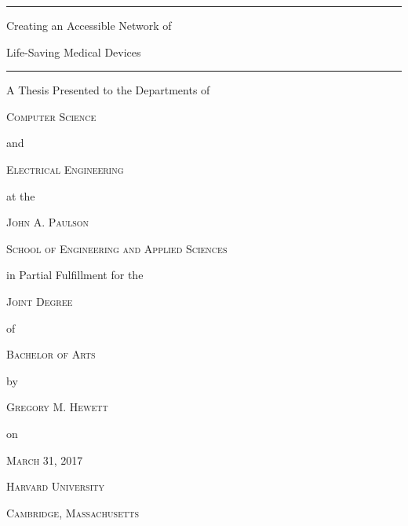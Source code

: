 \newcommand{\horrule}[1]{\rule{\linewidth}{#1}}

\begin{titlepage}
	\centering
	
	\horrule{0.7pt} \par
    {\huge Creating an Accessible Network of \par}
    {\huge Life-Saving Medical Devices \par}
    \horrule{0.7pt} \par
    \vspace{1cm}
    
    {\large A Thesis Presented to the Departments of \par}
    \vspace{0.25cm}
    {\scshape \large Computer Science \par}
    and \par
    {\scshape \large Electrical Engineering \par}
    \vspace{0.5cm}
    
    at the \par
    \vspace{0.05cm}
    {\scshape \large John A. Paulson \par}
    {\scshape \large School of Engineering and Applied Sciences \par}
    \vspace{0.75cm}
    
    in Partial Fulfillment for the \par
    \vspace{0.15cm}
    {\scshape \large Joint Degree \par}
    of
    \vspace{0.15cm}
    {\scshape \large Bachelor of Arts \par}
    \vspace{0.5cm}
    
    by \par
    {\scshape \large Gregory M. Hewett \par}
    \vspace{0.5cm}
    
    on \par
    {\scshape \large March 31, 2017}
    
    \vfill
    
    {\scshape \large Harvard University \par}
    {\scshape \large Cambridge, Massachusetts}
\end{titlepage}